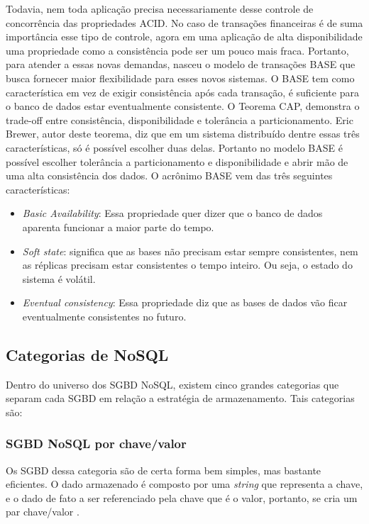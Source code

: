 	Todavia, nem toda aplicação precisa necessariamente desse controle de concorrência das propriedades ACID. No caso de transações financeiras é de suma importância esse tipo de controle, agora em uma aplicação de alta disponibilidade uma propriedade como a consistência pode ser um pouco mais fraca. Portanto, para atender a essas novas demandas, nasceu o modelo de transações BASE\cite{Pritchett:2008:BAA:1394127.1394128} que busca fornecer maior flexibilidade para esses novos sistemas. O BASE tem como característica em vez de exigir consistência após cada transação, é suficiente para o banco de dados estar eventualmente consistente. O Teorema CAP\cite{Brewer:2010:CFT:1835698.1835701}, demonstra o trade-off entre consistência, disponibilidade e tolerância a particionamento. Eric Brewer, autor deste teorema, diz que em um sistema distribuído dentre essas três características, só é possível escolher duas delas. Portanto no modelo BASE é possível escolher tolerância a particionamento e disponibilidade e abrir mão de uma alta consistência dos dados. O acrônimo BASE vem das três seguintes características:
	\begin{itemize}
		\item \textit{Basic Availability}: Essa propriedade quer dizer que o banco de dados aparenta funcionar a maior parte do tempo.
		\item \textit{Soft state}: significa que as bases não precisam estar sempre consistentes, nem as réplicas precisam estar consistentes o tempo inteiro. Ou seja, o estado do sistema é volátil.
		\item \textit{Eventual consistency}: Essa propriedade diz que as bases de dados vão ficar eventualmente consistentes no futuro. 
	\end{itemize}
	
\subsection{Categorias de NoSQL}
	Dentro do universo dos SGBD NoSQL, existem cinco grandes categorias que separam cada SGBD em relação a estratégia de armazenamento\cite{nayak2013type}. Tais categorias são:
	
\subsubsection{SGBD NoSQL por chave/valor}
	Os SGBD dessa categoria são de certa forma bem simples, mas bastante eficientes. O dado armazenado é composto por uma \textit{string} que representa a chave, e o dado de fato a ser referenciado pela chave que é o valor, portanto, se cria um par chave/valor \cite{nayak2013type}\cite{kauremerging}.
	

